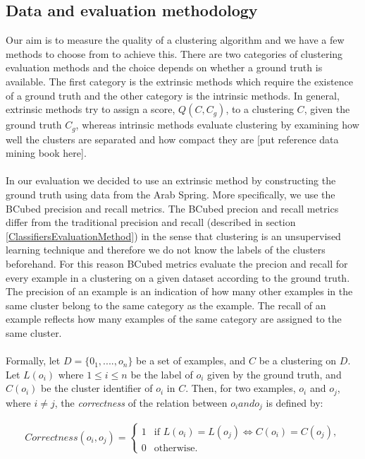    
\subsection{Data and evaluation methodology}\label{ClusteringEvaluationMethod}
Our aim is to measure the quality of a clustering algorithm and we have a few methods to choose from to achieve this. There are two categories of clustering evaluation methods and the choice depends
on whether a ground truth is available. The first category is the extrinsic methods which require the existence of a ground truth and the other category is the intrinsic methods. In general, extrinsic methods try to assign a score, $Q(C, C_g)$, to a clustering $C$, given the ground truth $C_g$, whereas intrinsic methods evaluate clustering by examining how well the clusters are separated and how compact they are [put reference data mining book here].\\\\ 
In our evaluation we decided to use an extrinsic method by constructing the ground truth using data from the Arab Spring. More specifically, we use the BCubed precision and recall metrics. The BCubed precion and recall metrics differ from the traditional precision and recall (described in section \ref{ClassifiersEvaluationMethod}) in the sense that clustering is an unsupervised learning technique and therefore we do not know the labels of the clusters beforehand. For this reason BCubed metrics evaluate the precion and recall for every example in a clustering on a given dataset according to the ground truth. The precision of an example is an indication of how many other examples in the same cluster belong to the same category as the example. The recall of an example reflects how many examples of the same category are assigned to the same cluster.\\\\ 
Formally, let $D = \{ 0_1,....,o_n \}$ be a set of examples, and $C$ be a clustering on $D$. Let $L(o_i)$ where $1 \leq i \leq n$ be the label of $o_i$ given by the ground truth, and $C(o_i)$ be the cluster identifier of $o_i$ in $C$. Then, for two examples, $o_i$ and $o_j$, where $i \neq j$, the \emph{correctness} of the relation between $o_i and o_j$ is defined by:

\begin{eqnarray}
Correctness(o_i, o_j) = \begin{cases}
                          1& \text{if $L(o_i) = L(o_j) \Leftrightarrow C(o_i) = C(o_j) $},\\
                          0& \text{otherwise}.
                        \end{cases}
\end{eqnarray} 


